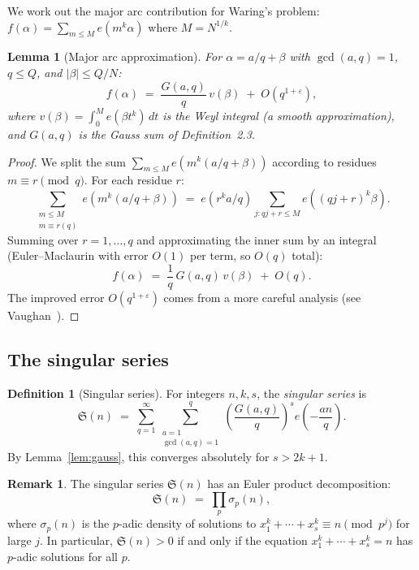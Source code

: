 \documentclass[12pt,a4paper]{amsart}
\newtheorem{lemma}[theorem]{Lemma}
\theoremstyle{definition}
\newtheorem{definition}[theorem]{Definition}
\newtheorem{remark}[theorem]{Remark}
\newcommand{\eq}[1]{e\!\left(#1\right)}
\begin{document}
We work out the major arc contribution for Waring's problem:
$f(\alpha) = \sum_{m \leq M} \eq{m^k \alpha}$ where $M = N^{1/k}$.

\begin{lemma}[Major arc approximation]\label{lem:major_approx}
  For $\alpha = a/q + \beta$ with $\gcd(a,q) = 1$, $q \leq Q$, and
  $|\beta| \leq Q/N$:
  \[
    f(\alpha) \;=\; \frac{G(a, q)}{q}\, v(\beta) \;+\; O\!\left(q^{1+\varepsilon}\right),
  \]
  where $v(\beta) = \int_0^M \eq{\beta t^k}\, dt$ is the \emph{Weyl integral}
  (a smooth approximation), and $G(a,q)$ is the Gauss sum of
  Definition~2.3.
\end{lemma}

\begin{proof}
  We split the sum $\sum_{m \leq M} \eq{m^k(a/q + \beta)}$ according to
  residues $m \equiv r \pmod q$.  For each residue $r$:
  \[
    \sum_{\substack{m \leq M\\ m \equiv r (q)}} \eq{m^k(a/q + \beta)}
    \;=\; \eq{r^k a/q} \sum_{j : qj+r \leq M} \eq{(qj+r)^k \beta}.
  \]
  Summing over $r = 1, \ldots, q$ and approximating the inner sum by an
  integral (Euler--Maclaurin with error $O(1)$ per term, so $O(q)$ total):
  \[
    f(\alpha) \;=\; \frac{1}{q}\, G(a, q)\, v(\beta) \;+\; O(q).
  \]
  The improved error $O(q^{1+\varepsilon})$ comes from a more careful
  analysis (see Vaughan~\cite{Vaughan1981}).
\end{proof}

\subsection{The singular series}

\begin{definition}[Singular series]\label{def:singular_series}
  For integers $n, k, s$, the \emph{singular series} is
  \[
    \mathfrak{S}(n) \;=\; \sum_{q=1}^{\infty} \sum_{\substack{a=1\\ \gcd(a,q)=1}}^{q}
                          \left(\frac{G(a,q)}{q}\right)^s \eq{-\frac{an}{q}}.
  \]
  By Lemma~\ref{lem:gauss}, this converges absolutely for $s > 2k+1$.
\end{definition}

\begin{remark}
  The singular series $\mathfrak{S}(n)$ has an Euler product decomposition:
  \[
    \mathfrak{S}(n) \;=\; \prod_p \sigma_p(n),
  \]
  where $\sigma_p(n)$ is the $p$-adic density of solutions to
  $x_1^k + \cdots + x_s^k \equiv n \pmod{p^j}$ for large $j$.
  In particular, $\mathfrak{S}(n) > 0$ if and only if the equation
  $x_1^k + \cdots + x_s^k = n$ has $p$-adic solutions for all $p$.
\end{remark}
\end{document}
